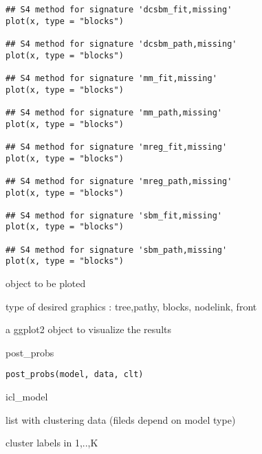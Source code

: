 \documentclass[letterpaper]{book}
\begin{document}
\begin{Usage}
\begin{verbatim}
## S4 method for signature 'dcsbm_fit,missing'
plot(x, type = "blocks")

## S4 method for signature 'dcsbm_path,missing'
plot(x, type = "blocks")

## S4 method for signature 'mm_fit,missing'
plot(x, type = "blocks")

## S4 method for signature 'mm_path,missing'
plot(x, type = "blocks")

## S4 method for signature 'mreg_fit,missing'
plot(x, type = "blocks")

## S4 method for signature 'mreg_path,missing'
plot(x, type = "blocks")

## S4 method for signature 'sbm_fit,missing'
plot(x, type = "blocks")

## S4 method for signature 'sbm_path,missing'
plot(x, type = "blocks")
\end{verbatim}
\end{Usage}
%
\begin{Arguments}
\begin{ldescription}
\item[\code{x}]  object to be ploted

\item[\code{type}] type of desired graphics : tree,pathy, blocks, nodelink, front
\end{ldescription}
\end{Arguments}
%
\begin{Value}
a ggplot2 object to visualize the results
\end{Value}
%
\begin{Description}\relax
post\_probs
\end{Description}
%
\begin{Usage}
\begin{verbatim}
post_probs(model, data, clt)
\end{verbatim}
\end{Usage}
%
\begin{Arguments}
\begin{ldescription}
\item[\code{model}] icl\_model

\item[\code{data}] list with clustering data (fileds depend on model type)

\item[\code{clt}] cluster labels in 1,..,K
\end{ldescription}
\end{Arguments}
\end{document}

